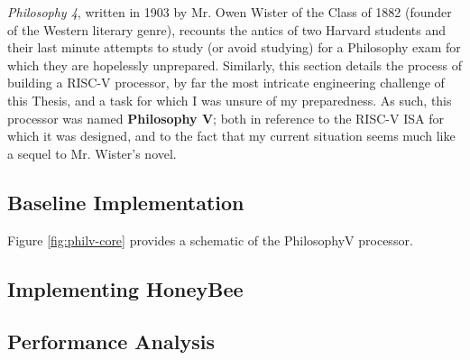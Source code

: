 \textit{Philosophy 4}, written in 1903 by Mr. Owen Wister of the Class of 1882 (founder of the Western literary genre), recounts the antics of two Harvard students and their last minute attempts to study (or avoid studying) for a Philosophy exam for which they are hopelessly unprepared. Similarly, this section details the process of building a RISC-V processor, by far the most intricate engineering challenge of this Thesis, and a task for which I was unsure of my preparedness. As such, this processor was named \textbf{Philosophy V}; both in reference to the RISC-V ISA for which it was designed, and to the fact that my current situation seems much like a sequel to Mr. Wister's novel.
    

    \subsection{Baseline Implementation}
        Figure \ref{fig:philv-core} provides a schematic of the PhilosophyV processor.
        \newpage
        \thispagestyle{empty}
         

    \subsection{Implementing HoneyBee}

    \subsection{Performance Analysis}
